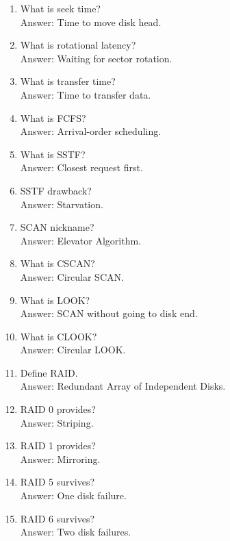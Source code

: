 \begin{enumerate}
\item What is seek time?\\
Answer: Time to move disk head.

\item What is rotational latency?\\
Answer: Waiting for sector rotation.

\item What is transfer time?\\
Answer: Time to transfer data.

\item What is FCFS?\\
Answer: Arrival-order scheduling.

\item What is SSTF?\\
Answer: Closest request first.

\item SSTF drawback?\\
Answer: Starvation.

\item SCAN nickname?\\
Answer: Elevator Algorithm.

\item What is CSCAN?\\
Answer: Circular SCAN.

\item What is LOOK?\\
Answer: SCAN without going to disk end.

\item What is CLOOK?\\
Answer: Circular LOOK.

\item Define RAID.\\
Answer: Redundant Array of Independent Disks.

\item RAID 0 provides?\\
Answer: Striping.

\item RAID 1 provides?\\
Answer: Mirroring.

\item RAID 5 survives?\\
Answer: One disk failure.

\item RAID 6 survives?\\
Answer: Two disk failures.


\end{enumerate}

